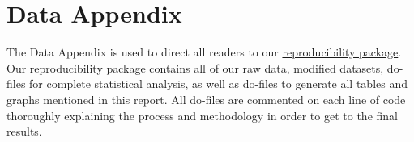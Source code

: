 \documentclass[12pt]{article}
\begin{document}
\newpage
\section*{Data Appendix} \label{sec:appendixa}

The Data Appendix is used to direct all readers to our \href{https://github.com/ecn310/course-project-taxes-tariffs/blob/main/Reproducibility_Package/README.md}{reproducibility package}. Our reproducibility package contains all of our raw data, modified datasets, do-files for complete statistical analysis, as well as do-files to generate all tables and graphs mentioned in this report. All do-files are commented on each line of code thoroughly explaining the process and methodology in order to get to the final results. 
\end{document}
